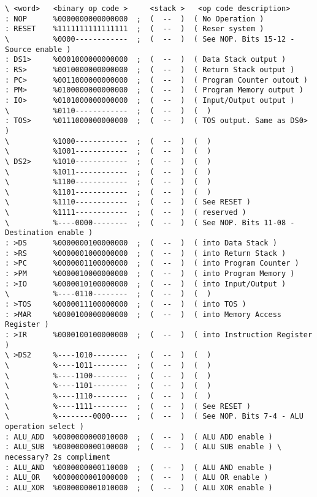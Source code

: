 \begin{figure*}[h!]
\begin{lstlisting}
\ <word>   <binary op code >     <stack >   <op code description>
: NOP      %0000000000000000  ;  (  --  )  ( No Operation )
: RESET    %1111111111111111  ;  (  --  )  ( Reser system )
\          %0000------------  ;  (  --  )  ( See NOP. Bits 15-12 - Source enable )
: DS1>     %0001000000000000  ;  (  --  )  ( Data Stack output )
: RS>      %0010000000000000  ;  (  --  )  ( Return Stack output )
: PC>      %0011000000000000  ;  (  --  )  ( Program Counter outout )
: PM>      %0100000000000000  ;  (  --  )  ( Program Memory output )
: IO>      %0101000000000000  ;  (  --  )  ( Input/Output output )
\          %0110------------  ;  (  --  )  (  )
: TOS>     %0111000000000000  ;  (  --  )  ( TOS output. Same as DS0> )
\          %1000------------  ;  (  --  )  (  )
\          %1001------------  ;  (  --  )  (  )
\ DS2>     %1010------------  ;  (  --  )  (  )
\          %1011------------  ;  (  --  )  (  )
\          %1100------------  ;  (  --  )  (  )
\          %1101------------  ;  (  --  )  (  )
\          %1110------------  ;  (  --  )  ( See RESET )
\          %1111------------  ;  (  --  )  ( reserved )
\          %----0000--------  ;  (  --  )  ( See NOP. Bits 11-08 - Destination enable )
: >DS      %0000000100000000  ;  (  --  )  ( into Data Stack )
: >RS      %0000001000000000  ;  (  --  )  ( into Return Stack )
: >PC      %0000001100000000  ;  (  --  )  ( into Program Counter )
: >PM      %0000010000000000  ;  (  --  )  ( into Program Memory )
: >IO      %0000010100000000  ;  (  --  )  ( into Input/Output )
\          %----0110--------  ;  (  --  )  (  )
: >TOS     %0000011100000000  ;  (  --  )  ( into TOS )
: >MAR     %0000100000000000  ;  (  --  )  ( into Memory Access Register )
: >IR      %0000100100000000  ;  (  --  )  ( into Instruction Register )
\ >DS2     %----1010--------  ;  (  --  )  (  )
\          %----1011--------  ;  (  --  )  (  )
\          %----1100--------  ;  (  --  )  (  )
\          %----1101--------  ;  (  --  )  (  )
\          %----1110--------  ;  (  --  )  (  )
\          %----1111--------  ;  (  --  )  ( See RESET )
\          %--------0000----  ;  (  --  )  ( See NOP. Bits 7-4 - ALU operation select )
: ALU_ADD  %0000000000010000  ;  (  --  )  ( ALU ADD enable )
: ALU_SUB  %0000000000100000  ;  (  --  )  ( ALU SUB enable ) \ necessary? 2s compliment
: ALU_AND  %0000000000110000  ;  (  --  )  ( ALU AND enable )
: ALU_OR   %0000000001000000  ;  (  --  )  ( ALU OR enable )
: ALU_XOR  %0000000001010000  ;  (  --  )  ( ALU XOR enable )

\end{lstlisting}
\end{figure*}
